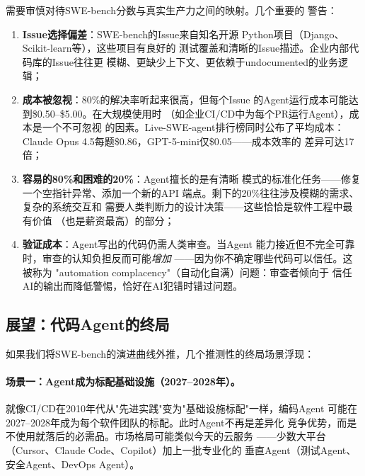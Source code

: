\begin{warnbox}
需要审慎对待SWE-bench分数与真实生产力之间的映射。几个重要的
警告：
\begin{enumerate}
  \item \textbf{Issue选择偏差}：SWE-bench的Issue来自知名开源
    Python项目（Django、Scikit-learn等），这些项目有良好的
    测试覆盖和清晰的Issue描述。企业内部代码库的Issue往往更
    模糊、更缺少上下文、更依赖于undocumented的业务逻辑；
  \item \textbf{成本被忽视}：80\%的解决率听起来很高，但每个Issue
    的Agent运行成本可能达到\$0.50--\$5.00。在大规模使用时
    （如企业CI/CD中为每个PR运行Agent），成本是一个不可忽视
    的因素。Live-SWE-agent排行榜同时公布了平均成本：Claude
    Opus 4.5每题\$0.86，GPT-5-mini仅\$0.05——成本效率的
    差异可达17倍；
  \item \textbf{容易的80\%和困难的20\%}：Agent擅长的是有清晰
    模式的标准化任务——修复一个空指针异常、添加一个新的API
    端点。剩下的20\%往往涉及模糊的需求、复杂的系统交互和
    需要人类判断力的设计决策——这些恰恰是软件工程中最有价值
    （也是薪资最高）的部分；
  \item \textbf{验证成本}：Agent写出的代码仍需人类审查。当Agent
    能力接近但不完全可靠时，审查的认知负担反而可能\textit{增加}
    ——因为你不确定哪些代码可以信任。这被称为
    "automation complacency"（自动化自满）问题：审查者倾向于
    信任AI的输出而降低警惕，恰好在AI犯错时错过问题。
\end{enumerate}
\end{warnbox}

\subsection{展望：代码Agent的终局}
\label{subsec:agent-endgame}

如果我们将SWE-bench的演进曲线外推，几个推测性的终局场景浮现：

\paragraph{场景一：Agent成为标配基础设施（2027--2028年）。}
就像CI/CD在2010年代从"先进实践"变为"基础设施标配"一样，编码Agent
可能在2027--2028年成为每个软件团队的标配。此时Agent不再是差异化
竞争优势，而是不使用就落后的必需品。市场格局可能类似今天的云服务
——少数大平台（Cursor、Claude Code、Copilot）加上一批专业化的
垂直Agent（测试Agent、安全Agent、DevOps Agent）。

